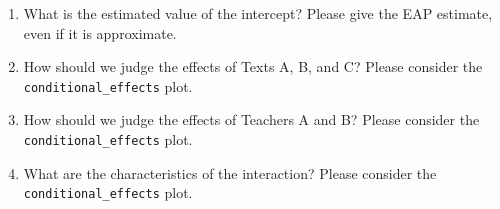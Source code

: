 \begin{enumerate}
	\item What is the estimated value of the intercept? Please give the EAP estimate, even if it is approximate.
	\item How should we judge the effects of Texts A, B, and C? Please consider the \verb|conditional_effects| plot.
	\item How should we judge the effects of Teachers A and B? Please consider the \verb|conditional_effects| plot.
	\item What are the characteristics of the interaction? Please consider the \verb|conditional_effects| plot.
\end{enumerate}
